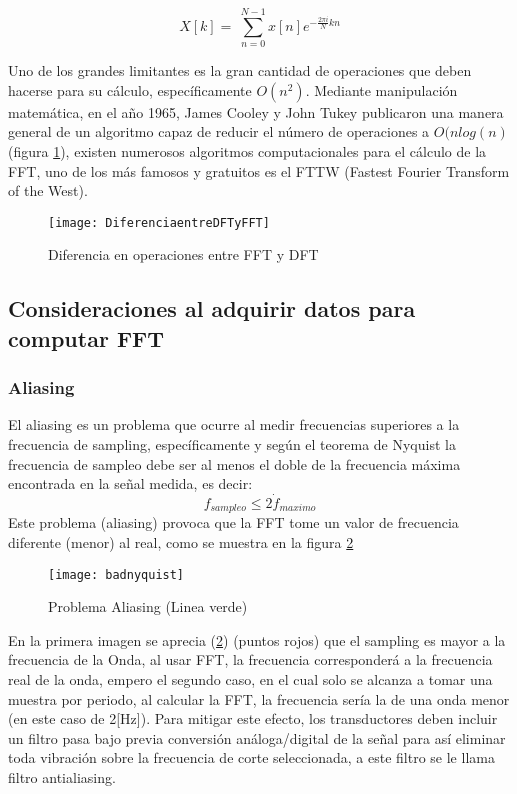 			\begin{equation}
				X\left[k\right]=\ \sum_{n=0}^{N-1}x[n]e^{-\frac{2\pi{}i}{N}kn}
				\label{eq:discretafourier}
			\end{equation}
			
			Uno de los grandes limitantes es la gran cantidad de operaciones que deben hacerse para su cálculo, específicamente $ O( n^2 ) $. Mediante manipulación matemática, en el año 1965, James Cooley y John Tukey publicaron una manera general de un algoritmo capaz de reducir el número de operaciones a $O(n log(n)$ (figura \ref{fig:diffftdft}), existen numerosos algoritmos computacionales para el cálculo de la FFT, uno de los más famosos y gratuitos es el FTTW (Fastest Fourier Transform of the West).
			\begin{figure}
				\centering
				\texttt{[image: DiferenciaentreDFTyFFT]}
				\caption{Diferencia en operaciones entre FFT y DFT}
				\label{fig:diffftdft}
			\end{figure}
		\subsection{Consideraciones al adquirir datos para computar FFT}
			\subsubsection{\textbf{Aliasing}}
				El aliasing es un problema que ocurre al medir frecuencias superiores a la frecuencia de sampling, específicamente y según el teorema de Nyquist la frecuencia de sampleo debe ser al menos el doble de la frecuencia máxima encontrada en la señal medida, es decir:
				\begin{equation}
					f_{sampleo} \leq 2\dot f_{maximo}
				\end{equation}
				Este problema (aliasing) provoca que la FFT tome un valor de frecuencia diferente (menor) al real, como se muestra en la figura \ref{fig:aliasing}
				\begin{figure}
					\centering
					\texttt{[image: badnyquist]}
					\caption{Problema Aliasing (Linea verde)}
					\label{fig:aliasing}
				\end{figure}
			
				En la primera imagen se aprecia (\ref{fig:aliasing}) (puntos rojos) que el sampling es mayor a la frecuencia de la Onda, al usar FFT, la frecuencia corresponderá a la frecuencia real de la onda, empero el segundo caso, en el cual solo se alcanza a tomar una muestra por periodo, al calcular la FFT, la frecuencia sería la de una onda menor (en este caso de 2[Hz]). Para mitigar este efecto, los transductores deben incluir un filtro pasa bajo previa conversión análoga/digital de la señal para así eliminar toda vibración sobre la frecuencia de corte seleccionada, a este filtro se le llama filtro antialiasing.

